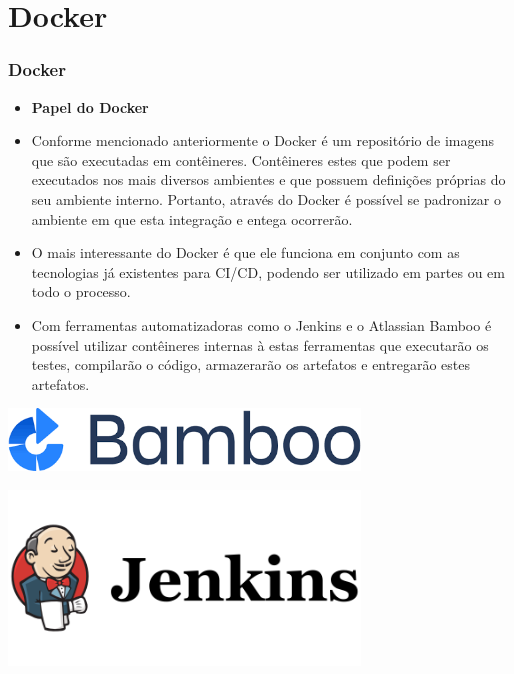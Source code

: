 \documentclass[10pt]{beamer}
\theoremstyle{remark}
\theoremstyle{definition}
\begin{document}
\section{Docker}
\begin{frame}[allowframebreaks]
\frametitle{Docker}
	
	\begin{itemize}
		\item \textbf{Papel do Docker}
		
		\item Conforme mencionado anteriormente o Docker é um repositório de imagens que são executadas em contêineres. Contêineres estes que podem ser executados nos mais diversos ambientes e que possuem definições próprias do seu ambiente interno. Portanto, através do Docker é possível se padronizar o ambiente em que esta integração e entega ocorrerão.
	\end{itemize}
	
	\framebreak
	
	\begin{itemize}
		\item O mais interessante do Docker é que ele funciona em conjunto com as tecnologias já existentes para CI/CD, podendo ser utilizado em partes ou em todo o processo.
		\item Com ferramentas automatizadoras como o Jenkins e o Atlassian Bamboo é possível utilizar contêineres internas à estas ferramentas que executarão os testes, compilarão o código, armazerarão os artefatos e entregarão estes artefatos.		
		
	\end{itemize}
	
	\framebreak
	
	\begin{center}
		\includegraphics[width=0.7\textwidth]{images/38.png}
	\end{center}
	
	\begin{center}
		\includegraphics[width=0.7\textwidth]{images/39.png}
	\end{center}
	

\end{frame}
\end{document}
